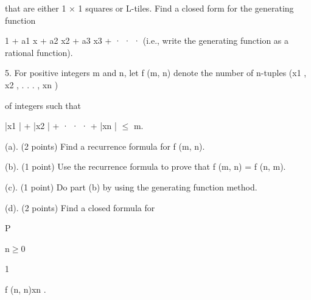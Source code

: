 \documentclass[a4paper,portrait,12pt]{article}
\begin{document}
\begin{flushleft}
that are either 1 × 1 squares or L-tiles. Find a closed form for the generating function
\end{flushleft}


\begin{flushleft}
1 + a1 x + a2 x2 + a3 x3 + · · · (i.e., write the generating function as a rational function).
\end{flushleft}


\begin{flushleft}
5. For positive integers m and n, let f (m, n) denote the number of n-tuples (x1 , x2 , . . . , xn )
\end{flushleft}


\begin{flushleft}
of integers such that
\end{flushleft}


\begin{flushleft}
|x1 | + |x2 | + · · · + |xn | $\leq$ m.
\end{flushleft}


\begin{flushleft}
(a). (2 points) Find a recurrence formula for f (m, n).
\end{flushleft}


\begin{flushleft}
(b). (1 point) Use the recurrence formula to prove that f (m, n) = f (n, m).
\end{flushleft}


\begin{flushleft}
(c). (1 point) Do part (b) by using the generating function method.
\end{flushleft}


\begin{flushleft}
(d). (2 points) Find a closed formula for
\end{flushleft}





\begin{flushleft}
P
\end{flushleft}





\begin{flushleft}
n$\geq$0
\end{flushleft}





1





\begin{flushleft}
f (n, n)xn .
\end{flushleft}





\newpage
\end{document}
